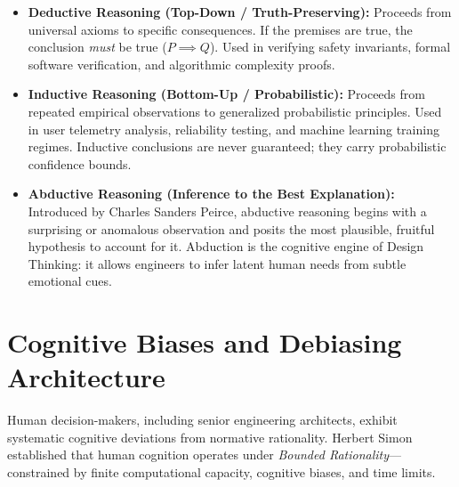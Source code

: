 \begin{definition}
\begin{itemize}
    \item \textbf{Deductive Reasoning (Top-Down / Truth-Preserving):} Proceeds from universal axioms to specific consequences. If the premises are true, the conclusion \textit{must} be true ($P \implies Q$). Used in verifying safety invariants, formal software verification, and algorithmic complexity proofs.
    \item \textbf{Inductive Reasoning (Bottom-Up / Probabilistic):} Proceeds from repeated empirical observations to generalized probabilistic principles. Used in user telemetry analysis, reliability testing, and machine learning training regimes. Inductive conclusions are never guaranteed; they carry probabilistic confidence bounds.
    \item \textbf{Abductive Reasoning (Inference to the Best Explanation):} Introduced by Charles Sanders Peirce, abductive reasoning begins with a surprising or anomalous observation and posits the most plausible, fruitful hypothesis to account for it. Abduction is the cognitive engine of Design Thinking: it allows engineers to infer latent human needs from subtle emotional cues.
\end{itemize}
\end{definition}

\section{Cognitive Biases and Debiasing Architecture}
Human decision-makers, including senior engineering architects, exhibit systematic cognitive deviations from normative rationality. Herbert Simon established that human cognition operates under \textit{Bounded Rationality}---constrained by finite computational capacity, cognitive biases, and time limits.

